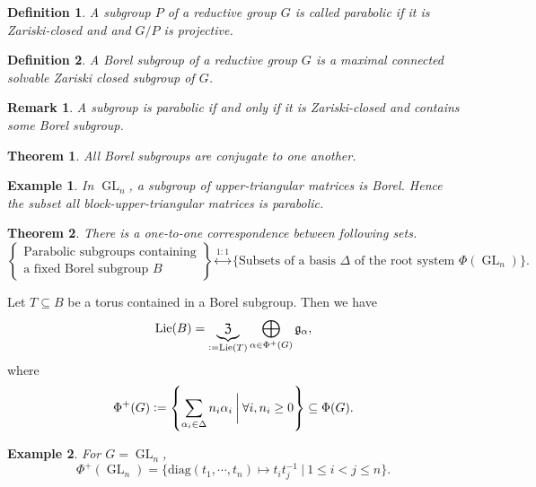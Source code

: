 \documentclass[10pt]{article}
\newtheorem{theorem}{Theorem} [section]
\newtheorem{definition}{Definition}[section]
\newtheorem{remark}{Remark}[section]
\newtheorem{example}{Example}[section]
\numberwithin{equation}{theorem}
\DeclareMathOperator{\GL}{GL}
\newcommand{\defeq}{\vcentcolon=}
\newcommand{\Lie}[0]{\mathrm{Lie}}
\newcommand{\g}[0]{\mathfrak{g}}
\newcommand{\sep}[0]{\:|\:}
\begin{document}
\begin{definition}
    A subgroup $P$ of a reductive group $G$ is called parabolic if it is Zariski-closed and and $G/P$ is projective. %
\end{definition}
\begin{definition}
    A Borel subgroup of a reductive group $G$ is a maximal connected solvable Zariski closed subgroup of $G$.
\end{definition}
\begin{remark}
    A subgroup is parabolic  if and only if it is Zariski-closed and contains some Borel subgroup.
\end{remark}

\begin{theorem}
    All Borel subgroups are conjugate to one another.
\end{theorem}


\begin{example}
    In $\GL_n$, a subgroup of upper-triangular matrices is Borel. Hence the subset all block-upper-triangular matrices is parabolic.
\end{example}

\begin{theorem}
    There is a one-to-one correspondence between following sets.
    \begin{equation*}
        \left\{\substack{\text{Parabolic subgroups containing}\\\text{a fixed Borel subgroup $B$}}\right\}\stackrel{1:1}{\leftrightarrow}\{\text{Subsets of a basis $\Delta$ of the root system $\Phi(\GL_n)$}\}.
    \end{equation*}
\end{theorem}

Let $T\subseteq B$ be a torus contained in a Borel subgroup. Then we have 
\begin{equation*}
    \Lie(B) = \underbrace{\mathfrak{Z}}_{\defeq \Lie(T)}\bigoplus_{\alpha\in\Phi^+(G)}\g_\alpha,
\end{equation*}
where 
\begin{equation*}
    \Phi^+(G)\defeq\left\{\sum_{\alpha_i\in\Delta}n_i\alpha_i\:\bigg{\vert}\: \forall i, n_i\geq0\right\}\subseteq\Phi(G).
\end{equation*}

\begin{example}
    For $G=\GL_n$, 
    \begin{equation*}
        \Phi^+(\GL_n) = \{\mathrm{diag}(t_1,\cdots,t_n)\mapsto t_it_j^{-1}\sep 1\leq i<j\leq n\}.
    \end{equation*}
\end{example}
\end{document}
